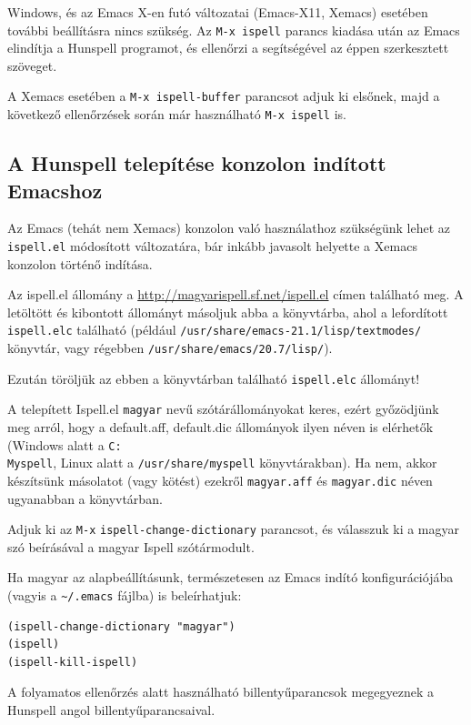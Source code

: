 Windows, és az Emacs X-en futó változatai (Emacs-X11, Xemacs)
esetében további beállításra nincs szükség. Az \texttt{M-x\ ispell}
parancs kiadása után az Emacs elindítja a Hunspell programot,
és ellenőrzi a segítségével az éppen szerkesztett szöveget.

A Xemacs esetében a \texttt{M-x\ ispell-buffer} parancsot
adjuk ki elsőnek, majd a következő ellenőrzések
során már használható \texttt{M-x\ ispell} is.

\subsection{A Hunspell telepítése konzolon indított Emacshoz}

Az Emacs (tehát nem Xemacs) konzolon való használathoz szükségünk
lehet az \texttt{ispell.el}
módosított változatára, bár inkább javasolt helyette a
Xemacs konzolon történő indítása.

Az ispell.el állomány a \url{http://magyarispell.sf.net/ispell.el} címen
található meg. A letöltött és kibontott állományt másoljuk abba a könyvtárba, ahol
a lefordított \texttt{ispell.elc} található (például
\texttt{/usr/share/emacs-21.1/lisp/textmodes/} könyvtár, vagy régebben
\texttt{/usr/share/emacs/20.7/lisp/}).

Ezután töröljük az ebben a könyvtárban található \texttt{ispell.elc} állományt!

A telepített Ispell.el \texttt{magyar} nevű szótárállományokat
keres, ezért győzödjünk meg arról, hogy a default.aff, default.dic
állományok ilyen néven is elérhetők (Windows alatt a
\texttt{C:\\Myspell}, Linux alatt a \texttt{/usr/share/myspell} könyvtárakban).
Ha nem, akkor készítsünk másolatot (vagy kötést) ezekről \texttt{magyar.aff}
és \texttt{magyar.dic} néven ugyanabban a könyvtárban.

Adjuk ki az \texttt{M-x} \texttt{ispell-change-dictionary} parancsot,
és válasszuk ki a magyar szó beírásával a magyar Ispell szótármodult.

Ha magyar az alapbeállításunk, természetesen az Emacs indító
konfigurációjába (vagyis a \verb+~/.emacs+ fájlba) is beleírhatjuk:

\begin{verbatim}
(ispell-change-dictionary "magyar")
(ispell)
(ispell-kill-ispell)
\end{verbatim}

A folyamatos ellenőrzés alatt használható billentyűparancsok
megegyeznek a Hunspell angol billentyűparancsaival.

